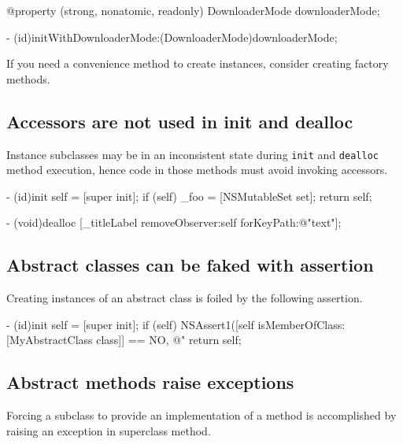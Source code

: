 \documentclass[10pt]{extarticle}
\newenvironment{tiplisting}
{\small\mdframed[middlelinewidth=0.5pt, middlelinecolor=GoldenDreamColor, skipabove=15pt]{\textbf{Tip:}}}
{\endmdframed\vspace{12pt}\normalsize}
\newcommand{\inlinecode}[1]{{\textcolor{TundoraColor}{\texttt{#1}}}}
\begin{document}
\begin{codelisting}
@property (strong, nonatomic, readonly) DownloaderMode downloaderMode;

- (id)initWithDownloaderMode:(DownloaderMode)downloaderMode;
\end{codelisting}

\begin{tiplisting}
If you need a convenience method to create instances, consider creating factory methods.
\end{tiplisting}


\subsection{Accessors are not used in init and dealloc}

Instance subclasses may be in an inconsistent state during \inlinecode{init} and \inlinecode{dealloc} method execution, hence code in those methods must avoid invoking accessors.

\begin{codelisting}
- (id)init
{
    self = [super init];
    if (self) {
        _foo = [NSMutableSet set];
    }
    return self;
}

- (void)dealloc
{
    [_titleLabel removeObserver:self forKeyPath:@"text"];
}
\end{codelisting}


\subsection{Abstract classes can be faked with assertion}

Creating instances of an abstract class is foiled by the following assertion.

\begin{codelisting}
- (id)init
{
    self = [super init];
    if (self) {
        NSAssert1([self isMemberOfClass:[MyAbstractClass class]] == NO,
                  @"%
    }
    return self;
}
\end{codelisting}


\subsection{Abstract methods raise exceptions}

Forcing a subclass to provide an implementation of a method is accomplished by raising an exception in superclass method.
\end{document}
